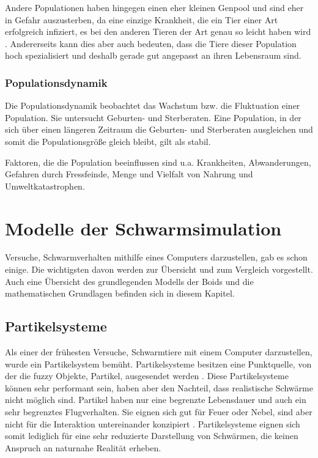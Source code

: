 \documentclass[draft=false
              ,paper=a4
              ,twoside=false
              ,fontsize=11pt
              ,headsepline
              ,BCOR10mm
              ,DIV11
              ,bibtotoc
              ,liststotoc
              ]{scrbook}
\begin{document}
Andere Populationen haben hingegen einen eher kleinen Genpool und sind eher in Gefahr auszusterben, da eine einzige Krankheit, die ein Tier einer Art erfolgreich infiziert, es bei den anderen Tieren der Art genau so leicht haben wird \cite{genetik}. Andererseits kann dies aber auch bedeuten, dass die Tiere dieser Population hoch spezialisiert und deshalb gerade gut angepasst an ihren Lebensraum sind.
\subsection{Populationsdynamik}
Die Populationsdynamik beobachtet das Wachstum bzw. die Fluktuation einer Population. Sie untersucht Geburten- und Sterberaten. Eine Population, in der sich über einen längeren Zeitraum die Geburten- und Sterberaten ausgleichen und somit die Populationsgröße gleich bleibt, gilt als stabil.

Faktoren, die die Population beeinflussen sind u.a. Krankheiten, Abwanderungen, Gefahren durch Fressfeinde, Menge und Vielfalt von Nahrung und Umweltkatastrophen.

\chapter{Modelle der Schwarmsimulation}\label{stand}
Versuche, Schwarmverhalten mithilfe eines Computers darzustellen, gab es schon einige. Die wichtigsten davon werden zur Übersicht und zum Vergleich vorgestellt. Auch eine Übersicht des grundlegenden Modells der Boids und die mathematischen Grundlagen befinden sich in diesem Kapitel.
\section{Partikelsysteme}
Als einer der frühesten Versuche, Schwarmtiere mit einem Computer darzustellen, wurde ein Partikelsystem bemüht. Partikelsysteme besitzen eine Punktquelle, von der die fuzzy Objekte, Partikel, ausgesendet werden \cite{Reeves:1983:PST:357318.357320}. Diese Partikelsysteme können sehr performant sein, haben aber den Nachteil, dass realistische Schwärme nicht möglich sind. Partikel haben nur eine begrenzte Lebensdauer und auch ein sehr begrenztes Flugverhalten. Sie eignen sich gut für Feuer oder Nebel, sind aber nicht für die Interaktion untereinander konzipiert \cite{reynolds87}. Partikelsysteme eignen sich somit lediglich für eine sehr reduzierte Darstellung von Schwärmen, die keinen Anspruch an naturnahe Realität erheben.
\end{document}
